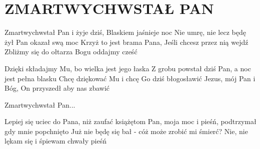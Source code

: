 \documentclass[../../../songbook.tex]{subfiles}
\begin{document}
\TabPositions{8cm} %
\section*{ZMARTWYCHWSTAŁ PAN}
{}
\vspace{0.5cm}
\-\hspace{1cm} Zmartwychwstał Pan i żyje dziś,	 \newline
\-\hspace{1cm} Blaskiem jaśnieje noc			 \newline
\-\hspace{1cm} Nie umrę, nie lecz będę żył		 \newline
\-\hspace{1cm} Pan okazał swą moc				 \newline
\-\hspace{1cm} Krzyż to jest brama Pana, 		 \newline
\-\hspace{1cm} Jeśli chcesz przez nią wejdź		 \newline
\-\hspace{1cm} Zbliżmy się do ołtarza			 \newline
\-\hspace{1cm} Bogu oddajmy cześć				 \newline

Dzięki składajmy Mu, bo wielka jest jego łaska	  \newline
Z grobu powstał dziś Pan, a noc jest pełna blasku 				 \newline
Chcę dziękować Mu i chcę Go dziś błogosławić				 \newline
Jezus, mój Pan i Bóg, On przyszedł aby nas zbawić				 \newline

\-\hspace{1cm} Zmartwychwstał Pan...				 \newline

Lepiej się uciec do Pana, niż zaufać książętom				 \newline
Pan, moja moc i pieśń, podtrzymał gdy mnie popchnięto				 \newline
Już nie będę się bał - cóż może zrobić mi śmierć?				 \newline
Nie, nie lękam się i śpiewam chwały pieśń				 \newline
\end{document}
